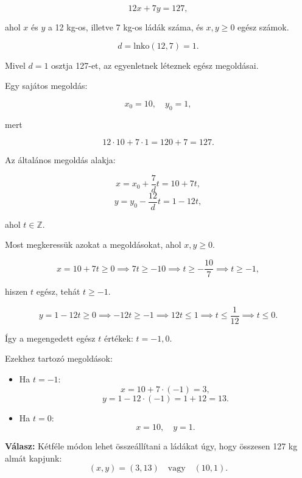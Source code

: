 \begin{solution}
\[
12x+7y=127,
\]

ahol $x$ és $y$ a 12 kg-os, illetve 7 kg-os ládák száma, és $x,y\geq0$
egész számok.

\bigskip{}

\[
d=\mathrm{lnko}(12,7)=1.
\]

Mivel $d=1$ osztja 127-et, az egyenletnek léteznek egész megoldásai.

\bigskip{}

Egy sajátos megoldás:

\[
x_{0}=10,\quad y_{0}=1,
\]

mert

\[
12\cdot10+7\cdot1=120+7=127.
\]

\bigskip{}

Az általános megoldás alakja:

\[
x=x_{0}+\frac{7}{d}t=10+7t,
\]
\[
y=y_{0}-\frac{12}{d}t=1-12t,
\]

ahol $t\in\mathbb{Z}$.

\bigskip{}

Most megkeressük azokat a megoldásokat, ahol $x,y\geq0$.

\[
x=10+7t\geq0\implies7t\geq-10\implies t\geq-\frac{10}{7}\implies t\geq-1,
\]

hiszen $t$ egész, tehát $t\geq-1$.

\[
y=1-12t\geq0\implies-12t\geq-1\implies12t\leq1\implies t\leq\frac{1}{12}\implies t\leq0.
\]

\bigskip{}

Így a megengedett egész $t$ értékek: $t=-1,0$.

\bigskip{}

Ezekhez tartozó megoldások:
\begin{itemize}
\item Ha $t=-1$: 
\[
x=10+7\cdot(-1)=3,
\]
\[
y=1-12\cdot(-1)=1+12=13.
\]
\item Ha $t=0$: 
\[
x=10,\quad y=1.
\]
\end{itemize}

\textbf{Válasz:} Kétféle módon lehet összeállítani a ládákat úgy,
hogy összesen 127 kg almát kapjunk:
\[
(x,y)=(3,13)\quad\text{vagy}\quad(10,1).
\]
\end{solution}

